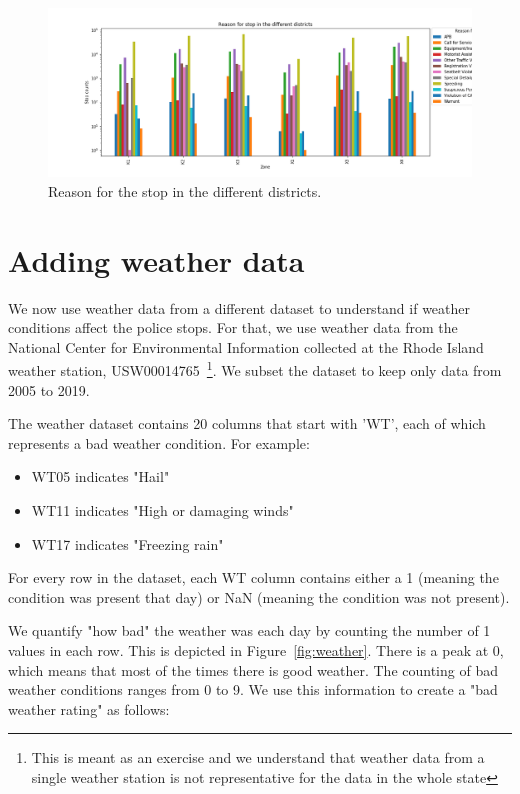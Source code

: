 \documentclass{article}
\begin{document}
 \begin{figure}[h]
 \centering
\includegraphics[scale=0.4, valign=t]{../figures/fig_violations_district.png}
\caption{Reason for the stop in the different districts.} \label{fig:district}
\end{figure}   
\FloatBarrier

\section{Adding weather data}
We now use weather data from a different dataset to understand if weather conditions affect the police stops. For that, we use weather data from the National Center for Environmental Information collected at the Rhode Island weather station, USW00014765~\cite{WeatherWeb,WeatherWeb1}\footnote{This is meant as an exercise and we understand that weather data from a single weather station is not representative for the data in the whole state}. We subset the dataset to keep only data from 2005 to 2019.

The weather dataset contains 20 columns that start with 'WT', each of which represents a bad weather condition. For example:

\begin{itemize}
\item WT05 indicates "Hail"
\item WT11 indicates "High or damaging winds"
\item WT17 indicates "Freezing rain"
\end{itemize}

For every row in the dataset, each WT column contains either a 1 (meaning the condition was present that day) or NaN (meaning the condition was not present).

We quantify "how bad" the weather was each day by counting the number of 1 values in each row. This is depicted in Figure~\ref{fig:weather}. There is a peak at 0, which means that most of the times there is good weather. The counting of bad weather conditions ranges from 0 to 9. We use this information to create a "bad weather rating" as follows:
\end{document}
